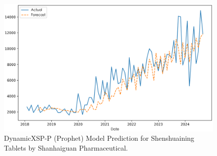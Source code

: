 \documentclass[12pt]{article}
\begin{document}
\begin{itemize}
\begin{figure}[H]
\centering
\includegraphics[width=\linewidth]{../Result_Paper/Prophet_Prediction_肾衰宁片_山海关药业.png}
\caption{DynamicXSP-P (Prophet) Model Prediction for Shenshuaining Tablets by Shanhaiguan Pharmaceutical.}
\label{fig:shenshuaining}
\end{figure}
\end{itemize}
\end{document}
